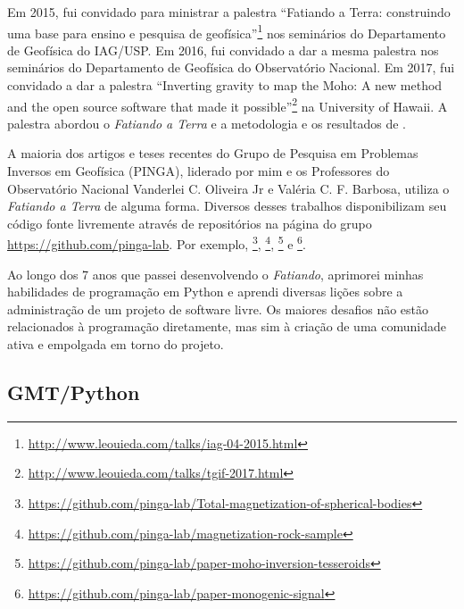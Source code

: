 Em 2015, fui convidado para ministrar a palestra ``Fatiando a Terra:
construindo uma base para ensino e pesquisa de
geofísica''\footnote{\url{http://www.leouieda.com/talks/iag-04-2015.html}} nos
seminários do Departamento de Geofísica do IAG/USP.
Em 2016, fui convidado a dar a mesma palestra nos seminários do Departamento de
Geofísica do Observatório Nacional.
Em 2017, fui convidado a dar a palestra ``Inverting gravity to map the Moho: A
new method and the open source software that made it
possible''\footnote{\url{http://www.leouieda.com/talks/tgif-2017.html}}
na University of Hawaii.
A palestra abordou o \textit{Fatiando a Terra} e a metodologia e os resultados
de \citet{moho}.

A maioria dos artigos e teses recentes do Grupo de Pesquisa em Problemas
Inversos em Geofísica (PINGA), liderado por mim e os Professores do
Observatório Nacional
Vanderlei C. Oliveira Jr e Valéria C. F. Barbosa,
utiliza o \textit{Fatiando a Terra} de alguma forma.
Diversos desses trabalhos disponibilizam seu código fonte livremente através de
repositórios na página do grupo \url{https://github.com/pinga-lab}.
Por exemplo,
\citet{magdir}\footnote{\url{https://github.com/pinga-lab/Total-magnetization-of-spherical-bodies}},
\citet{reis2016}\footnote{\url{https://github.com/pinga-lab/magnetization-rock-sample}},
\citet{moho}\footnote{\url{https://github.com/pinga-lab/paper-moho-inversion-tesseroids}}
e
\citet{monogenic2017}\footnote{\url{https://github.com/pinga-lab/paper-monogenic-signal}}.

Ao longo dos 7 anos que passei desenvolvendo o \textit{Fatiando},
aprimorei minhas habilidades de programação em Python e aprendi diversas lições
sobre a administração de um projeto de software livre.
Os maiores desafios não estão relacionados à programação diretamente, mas sim à
criação de uma comunidade ativa e empolgada em torno do projeto.


\subsection{GMT/Python}

